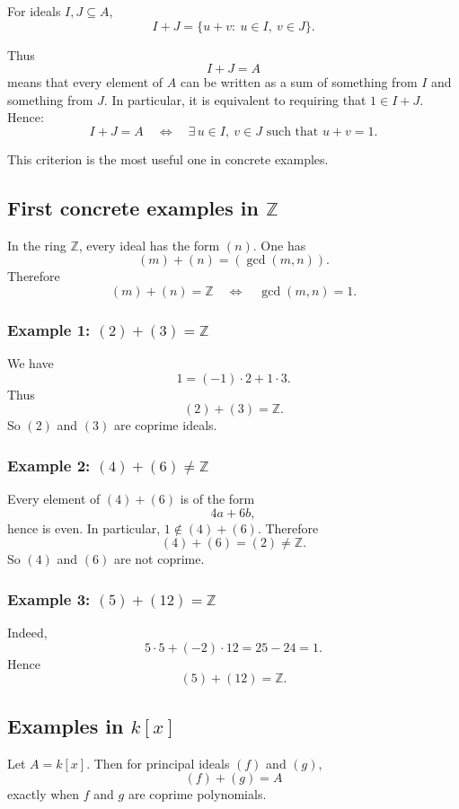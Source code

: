 \documentclass[12pt,a4paper]{article}
\theoremstyle{notespace}
\begin{document}
For ideals \(I,J\subseteq A\),
\[
I+J=\{u+v:\ u\in I,\ v\in J\}.
\]

Thus
\[
I+J=A
\]
means that every element of \(A\) can be written as a sum of something from \(I\) and something from \(J\). In particular, it is equivalent to requiring that \(1\in I+J\). Hence:
\[
I+J=A
\quad\Longleftrightarrow\quad
\exists\,u\in I,\ v\in J\text{ such that }u+v=1.
\]

This criterion is the most useful one in concrete examples.

\subsection{First concrete examples in \(\mathbb Z\)}

In the ring \(\mathbb Z\), every ideal has the form \((n)\). One has
\[
(m)+(n)=(\gcd(m,n)).
\]
Therefore
\[
(m)+(n)=\mathbb Z
\quad\Longleftrightarrow\quad
\gcd(m,n)=1.
\]

\subsubsection*{Example 1: \((2)+(3)=\mathbb Z\)}

We have
\[
1=(-1)\cdot 2+1\cdot 3.
\]
Thus
\[
(2)+(3)=\mathbb Z.
\]
So \((2)\) and \((3)\) are coprime ideals.

\subsubsection*{Example 2: \((4)+(6)\neq \mathbb Z\)}

Every element of \((4)+(6)\) is of the form
\[
4a+6b,
\]
hence is even. In particular, \(1\notin (4)+(6)\). Therefore
\[
(4)+(6)=(2)\neq \mathbb Z.
\]
So \((4)\) and \((6)\) are not coprime.

\subsubsection*{Example 3: \((5)+(12)=\mathbb Z\)}

Indeed,
\[
5\cdot 5+(-2)\cdot 12=25-24=1.
\]
Hence
\[
(5)+(12)=\mathbb Z.
\]

\subsection{Examples in \(k[x]\)}

Let \(A=k[x]\). Then for principal ideals \((f)\) and \((g)\),
\[
(f)+(g)=A
\]
exactly when \(f\) and \(g\) are coprime polynomials.
\end{document}
